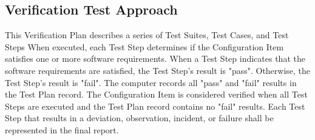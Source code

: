 \subsection{Verification Test Approach}
This Verification Plan describes a series of Test Suites, Test Cases, and Test
Steps When executed, each Test Step determines if the Configuration Item
satisfies one or more software requirements.  When a Test Step indicates that
the software requirements are satisfied, the Test Step's result is "pass".
Otherwise, the Test Step's result is "fail".  The computer records all "pass"
and "fail" results in the Test Plan record.  The Configuration Item is
considered verified when all Test Steps are executed and the Test Plan record
contains no "fail" results.  Each Test Step that results in a deviation,
observation, incident, or failure shall be represented in the final report.
